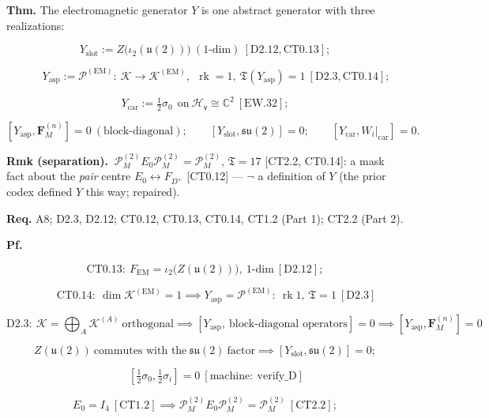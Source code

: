\begin{theorem}\label{tag:EW-8}
\textbf{Thm.} The electromagnetic generator $Y$ is one abstract generator with three realizations:

\[
Y_{\mathrm{slot}}:=Z\bigl(\iota_2(\mathfrak u(2))\bigr)\ (1\text{-dim})\ [\mathrm{D2.12},\mathrm{CT0.13}];
\]

\[
\qquad Y_{\mathrm{asp}}:=\mathcal P^{(\mathrm{EM})}:\ \mathcal K\to\mathcal K^{(\mathrm{EM})},\ \ \operatorname{rk}=1,\ \mathfrak T(Y_{\mathrm{asp}})=1\ [\mathrm{D2.3},\mathrm{CT0.14}];
\]

\[
Y_{\mathrm{car}}:=\tfrac12\sigma_0\ \ \text{on}\ \mathcal H_{\mathsf v}\cong\mathbb C^2\ [\mathrm{EW.32}];
\]

\[
[Y_{\mathrm{asp}},\mathbf F_M^{(n)}]=0\ (\text{block-diagonal});\qquad
[Y_{\mathrm{slot}},\mathfrak{su}(2)]=0;\qquad
[Y_{\mathrm{car}},W_i|_{\mathrm{car}}]=0 .
\]

\textbf{Rmk (separation).} $\ \mathcal P_M^{(2)}E_0\mathcal P_M^{(2)}=\mathcal P_M^{(2)}$, $\mathfrak T=17$ [CT2.2, CT0.14]: a mask fact about the \textit{pair} centre $E_0\leftrightarrow F_{D^+}$ [CT0.12] — $\neg$ a definition of $Y$ (the prior codex defined $Y$ this way; repaired).

\textbf{Req.} A8; D2.3, D2.12; CT0.12, CT0.13, CT0.14, CT1.2 (Part 1); CT2.2 (Part 2).

\textbf{Pf.}

\[
\mathrm{CT0.13}:\ F_{\mathrm{EM}}=\iota_2\bigl(Z(\mathfrak u(2))\bigr),\ 1\text{-dim}\ [\mathrm{D2.12}];
\]

\[
\qquad \mathrm{CT0.14}:\ \dim\mathcal K^{(\mathrm{EM})}=1\implies Y_{\mathrm{asp}}=\mathcal P^{(\mathrm{EM})}:\ \operatorname{rk}1,\ \mathfrak T=1\ [\mathrm{D2.3}]
\]

\[
\mathrm{D2.3}:\ \mathcal K=\bigoplus_A\mathcal K^{(A)}\ \text{orthogonal}\implies[Y_{\mathrm{asp}},\ \text{block-diagonal operators}]=0\implies[Y_{\mathrm{asp}},\mathbf F_M^{(n)}]=0
\]

\[
Z(\mathfrak u(2))\ \text{commutes with the}\ \mathfrak{su}(2)\ \text{factor}\implies[Y_{\mathrm{slot}},\mathfrak{su}(2)]=0;
\]

\[
\qquad [\tfrac12\sigma_0,\tfrac12\sigma_i]=0\ [\text{machine}:\ \text{verify\_D}]
\]

\[
E_0=I_4\ [\mathrm{CT1.2}]\implies\mathcal P_M^{(2)}E_0\mathcal P_M^{(2)}=\mathcal P_M^{(2)}\ [\mathrm{CT2.2}];
\]


\end{theorem}
